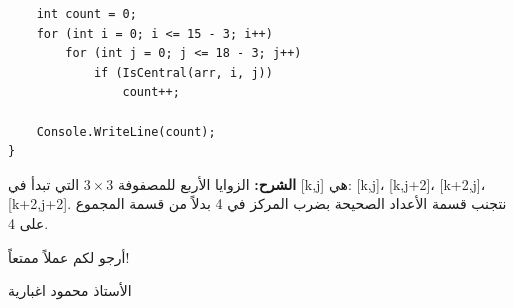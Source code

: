 \documentclass[14pt]{extarticle}
\begin{document}
\begin{enumerate}[itemsep=2em]
\begin{boxSolution}
\begin{boxCode}
\begin{english}
\begin{verbatim}
    int count = 0;
    for (int i = 0; i <= 15 - 3; i++)
        for (int j = 0; j <= 18 - 3; j++)
            if (IsCentral(arr, i, j))
                count++;

    Console.WriteLine(count);
}
\end{verbatim}
\end{english}
\end{boxCode}
\textbf{الشرح:} الزوايا الأربع للمصفوفة $3\times3$ التي تبدأ في \textenglish{[k,j]} هي: \textenglish{[k,j]}، \textenglish{[k,j+2]}، \textenglish{[k+2,j]}، \textenglish{[k+2,j+2]}. نتجنب قسمة الأعداد الصحيحة بضرب المركز في 4 بدلاً من قسمة المجموع على 4.
\end{boxSolution}
\fi

\end{enumerate}

\vspace{1cm}
\begin{flushleft}
أرجو لكم عملاً ممتعاً!

الأستاذ محمود اغبارية
\end{flushleft}
\end{document}
